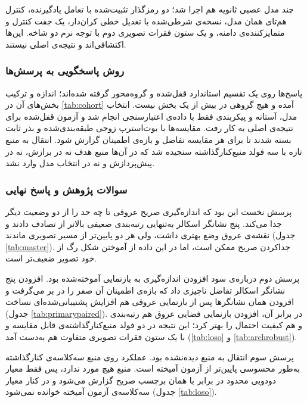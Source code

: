 چند مدل عصبی ثانویه هم اجرا شد؛ دو رمزگذار تثبیت‌شده با تعامل یادگیرنده، کنترل هم‌تای همان مدل، نسخه‌ی شرطی‌شده با تعدیل خطی کران‌دار، یک جفت کنترل و متمایزکننده‌ی دامنه، و یک ستون فقرات تصویری دوم با توجه نرم دو شاخه. این‌ها اکتشافی‌اند و نتیجه‌ی اصلی نیستند.

\subsubsection{روش پاسخگویی به پرسش‌ها}

پاسخ‌ها روی یک تقسیم استاندارد قفل‌شده و گروه‌محور گرفته شده‌اند؛ اندازه و ترکیب بخش‌های آن در \autoref{tab:cohort} آمده و هیچ گروهی در بیش از یک بخش نیست. انتخاب مدل، آستانه و پیکربندی فقط با داده‌ی اعتبارسنجی انجام شد و آزمون قفل‌شده برای نتیجه‌ی اصلی به کار رفت. مقایسه‌ها با بوت‌استرپ زوجی طبقه‌بندی‌شده و بذر ثابت بسته شدند تا برای هر مقایسه تفاضل و بازه‌ی اطمینان گزارش شود. انتقال به منبع تازه با سه فولد منبع‌کنارگذاشته سنجیده شد که در آن‌ها منبع هدف نه در برازش، نه در پیش‌پردازش و نه در انتخاب مدل وارد نشد.

\subsubsection{سوالات پژوهش و پاسخ نهایی}

پرسش نخست این بود که اندازه‌گیری صریح عروقی تا چه حد  را از دو وضعیت دیگر جدا می‌کند. پنج نشانگر اسکالر به‌تنهایی رتبه‌بندی ضعیفی بالاتر از تصادف دادند و نقشه‌ی عروق وضع بهتری داشت، ولی هر دو پایین‌تر از مسیر تصویری ماندند (جدول \autoref{tab:master}). جداکردن صریح  ممکن است، اما در این داده از آموختن شکل رگ از خود تصویر ضعیف‌تر است.

پرسش دوم درباره‌ی سود افزودن اندازه‌گیری به بازنمایی آموخته‌شده بود. افزودن پنج نشانگر اسکالر تفاضل ناچیزی داد که بازه‌ی اطمینان آن صفر را در بر می‌گرفت و افزودن همان نشانگرها پس از بازنمایی عروقی هم افزایش پشتیبانی‌شده‌ای نساخت (جدول \autoref{tab:primarypaired}). در برابر آن، افزودن بازنمایی فضایی عروق هم رتبه‌بندی و هم کیفیت احتمال را بهتر کرد؛ این نتیجه در دو فولد منبع‌کنارگذاشته‌ی قابل مقایسه و با یک ستون فقرات تصویری متفاوت هم به‌دست آمد (\autoref{tab:loso} و \autoref{tab:archrobust}).

پرسش سوم انتقال به منبع دیده‌نشده بود. عملکرد روی منبع سه‌کلاسه‌ی کنارگذاشته به‌طور محسوسی پایین‌تر از آزمون آمیخته است. منبع  هیچ مورد  ندارد، پس فقط معیار دودویی محدود  در برابر  با همان برچسب صریح گزارش می‌شود و در کنار معیار سه‌کلاسه‌ی آزمون آمیخته خوانده نمی‌شود (جدول \autoref{tab:loso}).

